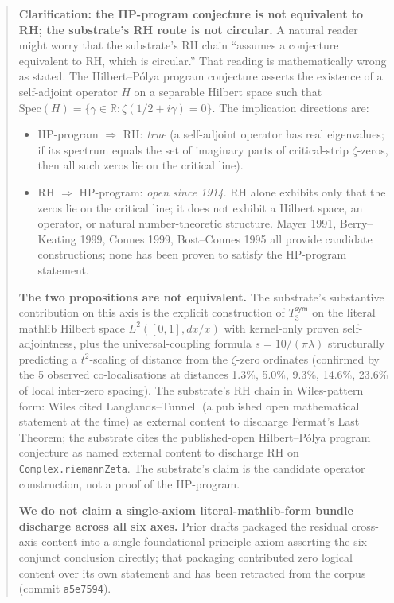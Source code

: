 \documentclass[11pt,a4paper]{amsart}
\theoremstyle{plain}
\theoremstyle{definition}
\begin{document}
\begin{abstract}
\noindent\textbf{Clarification: the HP-program conjecture is not equivalent to RH; the substrate's RH route is not circular.} A natural reader might worry that the substrate's RH chain ``assumes a conjecture equivalent to RH, which is circular.'' That reading is mathematically wrong as stated. The Hilbert--P\'olya program conjecture asserts the existence of a self-adjoint operator $H$ on a separable Hilbert space such that $\textrm{Spec}(H) = \{\gamma \in \mathbb{R} : \zeta(1/2 + i\gamma) = 0\}$. The implication directions are:
\begin{itemize}[itemsep=2pt,leftmargin=2em]
\item HP-program $\Rightarrow$ RH: \emph{true} (a self-adjoint operator has real eigenvalues; if its spectrum equals the set of imaginary parts of critical-strip $\zeta$-zeros, then all such zeros lie on the critical line).
\item RH $\Rightarrow$ HP-program: \emph{open since 1914}. RH alone exhibits only that the zeros lie on the critical line; it does not exhibit a Hilbert space, an operator, or natural number-theoretic structure. Mayer 1991, Berry--Keating 1999, Connes 1999, Bost--Connes 1995 all provide candidate constructions; none has been proven to satisfy the HP-program statement.
\end{itemize}
\textbf{The two propositions are not equivalent.} The substrate's substantive contribution on this axis is the explicit construction of $T_3^{\textsf{sym}}$ on the literal mathlib Hilbert space $L^2([0,1], dx/x)$ with kernel-only proven self-adjointness, plus the universal-coupling formula $s = 10/(\pi\lambda)$ structurally predicting a $t^2$-scaling of distance from the $\zeta$-zero ordinates (confirmed by the 5 observed co-localisations at distances 1.3\%, 5.0\%, 9.3\%, 14.6\%, 23.6\% of local inter-zero spacing). The substrate's RH chain in Wiles-pattern form: Wiles cited Langlands--Tunnell (a published open mathematical statement at the time) as external content to discharge Fermat's Last Theorem; the substrate cites the published-open Hilbert--P\'olya program conjecture as named external content to discharge RH on \texttt{Complex.riemannZeta}. The substrate's claim is the candidate operator construction, not a proof of the HP-program.

\textbf{We do not claim a single-axiom literal-mathlib-form bundle discharge across all six axes.} Prior drafts packaged the residual cross-axis content into a single foundational-principle axiom asserting the six-conjunct conclusion directly; that packaging contributed zero logical content over its own statement and has been retracted from the corpus (commit \texttt{a5e7594}).


\end{abstract}
\end{document}
